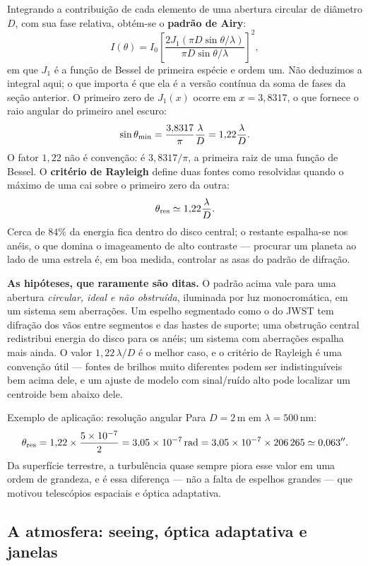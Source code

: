 \documentclass[11pt,a4paper]{article}
\begin{document}
Integrando a contribuição de cada elemento de uma abertura circular de diâmetro $D$, com sua fase relativa,
obtém-se o \textbf{padrão de Airy}:
\[
I(\theta)=I_0\left[\frac{2J_1(\pi D\sin\theta/\lambda)}{\pi D\sin\theta/\lambda}\right]^{2},
\]
em que $J_1$ é a função de Bessel de primeira espécie e ordem um. Não deduzimos a integral aqui; o que importa é
que ela é a versão contínua da soma de fases da seção anterior. O primeiro zero de $J_1(x)$ ocorre em
$x=3{,}8317$, o que fornece o raio angular do primeiro anel escuro:
\[
\sin\theta_{\rm min}=\frac{3{,}8317}{\pi}\frac{\lambda}{D}=1{,}22\frac{\lambda}{D}.
\]
O fator $1{,}22$ não é convenção: é $3{,}8317/\pi$, a primeira raiz de uma função de Bessel. O \textbf{critério de
Rayleigh} define duas fontes como resolvidas quando o máximo de uma cai sobre o primeiro zero da outra:
\[
\theta_{\rm res}\simeq1{,}22\frac{\lambda}{D}.
\]
Cerca de $84\%$ da energia fica dentro do disco central; o restante espalha-se nos anéis, o que domina o
imageamento de alto contraste --- procurar um planeta ao lado de uma estrela é, em boa medida, controlar as asas
do padrão de difração.

\begin{noticebox}
\textbf{As hipóteses, que raramente são ditas.} O padrão acima vale para uma abertura \emph{circular, ideal e não
obstruída}, iluminada por luz monocromática, em um sistema sem aberrações. Um espelho segmentado como o do JWST
tem difração dos vãos entre segmentos e das hastes de suporte; uma obstrução central redistribui energia do disco
para os anéis; um sistema com aberrações espalha mais ainda. O valor $1{,}22\,\lambda/D$ é o melhor caso, e o
critério de Rayleigh é uma convenção útil --- fontes de brilhos muito diferentes podem ser indistinguíveis bem
acima dele, e um ajuste de modelo com sinal/ruído alto pode localizar um centroide bem abaixo dele.
\end{noticebox}

\begin{lessonblock}{Exemplo de aplicação: resolução angular}
Para $D=2\,\mathrm{m}$ em $\lambda=500\,\mathrm{nm}$:
\[
\theta_{\rm res}=1{,}22\times\frac{5\times10^{-7}}{2}=3{,}05\times10^{-7}\,\mathrm{rad}
=3{,}05\times10^{-7}\times206\,265\simeq0{,}063''.
\]
Da superfície terrestre, a turbulência quase sempre piora esse valor em uma ordem de grandeza, e é essa diferença
--- não a falta de espelhos grandes --- que motivou telescópios espaciais e óptica adaptativa.
\end{lessonblock}

\subsection*{A atmosfera: seeing, óptica adaptativa e janelas}
\end{document}
